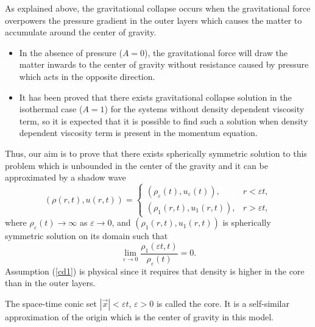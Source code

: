 \documentclass[reqno]{article}%
\theoremstyle{plain}
\theoremstyle{definition}
\theoremstyle{remark}
\numberwithin{equation}{section}
\begin{document}
 As explained above, the gravitational collapse occurs when the gravitational force overpowers the pressure gradient in the outer layers which causes the matter to accumulate around the  center of gravity. 
 \begin{itemize}
 \item[-] In the absence of pressure ($A=0$), the gravitational force will draw the matter inwards to the center of gravity without  resistance caused by pressure  which acts in the opposite direction. 
 \item[-] It has been  proved that there exists gravitational collapse solution in the isothermal case ($A=1$) for the systems without  density  dependent viscosity term, so it is expected that it is possible to find such a solution when density dependent viscosity term is present in the momentum equation.
 \end{itemize}

Thus, our aim is to prove that there exists spherically symmetric  solution to this problem which is unbounded in the center of the gravity  and it can be approximated by a  shadow wave
\begin{equation}\label{sdw}
(\rho(r,t),u(r,t))=
\begin{cases}
(\rho_\varepsilon(t), u_\varepsilon(t)), & r<\varepsilon t,\\
(\rho_1(r,t),u_1(r,t)), & r>\varepsilon t,
\end{cases}\end{equation}
where $\rho_\varepsilon(t)\to \infty$ as $\varepsilon\to 0$, and $(\rho_1(r,t),u_1(r,t))$ is spherically symmetric solution on its domain such that 
\begin{equation}\label{cd1}
\lim_{\varepsilon\to 0}\frac{\rho_1(\varepsilon t,t)}{\rho_\varepsilon(t)}=0.
\end{equation}
Assumption (\ref{cd1}) is physical since it requires that density is higher in the core than in the outer layers.


The space-time	conic set $|\vec{x}|<\varepsilon t$,
 $\varepsilon>0$ is called the core. It is a self-similar approximation of the origin which is the center of gravity in this model.
 
 
\end{document}

